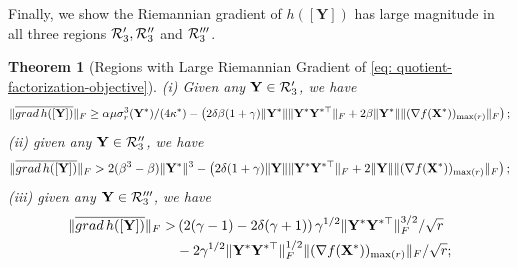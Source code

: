\documentclass[11pt]{article}
\newtheorem{Theorem}{Theorem}
\newcommand{\0}{{\mathbf{0}}}
\newcommand{\1}{{\mathbf{1}}}
\newcommand{\X}{{\mathbf{X}}}
\newcommand{\Y}{{\mathbf{Y}}}
\newcommand{\cR}{{\cal R}}
\newcommand{\grad}{{\rm grad}}
\newcommand{\F}{{\rm F}}
\begin{document}
Finally, we show the Riemannian gradient of $h([\Y])$ has large magnitude in all three regions $\cR'_3, \cR_3''$ and $ \cR_3'''$.

\begin{Theorem}[Regions with Large Riemannian Gradient of \eqref{eq: quotient-factorization-objective}] \label{th: h-large-gradient-norm}
	(i) Given any $\Y \in \cR_3'$, we have
	\begin{equation*}
		\|\overline{\grad\, h([\Y])} \|_\F \geq \alpha \mu \sigma^3_r(\Y^*)/(4\kappa^*) - \left( 2 \delta \beta ( 1 + \gamma) \|\Y^*\| \| \Y^* \Y^{*\top} \|_\F + 2 \beta \|\Y^*\| \| ( \nabla f(\X^*) )_{\max(r)} \|_\F \right);
	\end{equation*}
(ii) given any $\Y \in \cR_3''$, we have
	\begin{equation*}
		\|\overline{\grad\, h([\Y])} \|_\F > 2(\beta^3 - \beta) \|\Y^*\|^3 - \left( 2 \delta ( 1 + \gamma) \|\Y\| \| \Y^* \Y^{*\top} \|_\F + 2 \|\Y\| \| ( \nabla f(\X^*) )_{\max(r)} \|_\F \right);
	\end{equation*}
(iii) given any $\Y \in \cR_3'''$, we have
	\begin{equation*}
	\begin{split}
		\|\overline{\grad\, h([\Y])} \|_\F > &  \left( 2( \gamma- 1) - 2\delta(\gamma + 1) \right) \gamma^{1/2} \|\Y^*\Y^{*\top}\|^{3/2}_\F/\sqrt{r}  \\
		& - 2 \gamma^{1/2}\|\Y^*\Y^{*\top}\|^{1/2}_\F\| ( \nabla f(\X^*) )_{\max(r)} \|_\F/\sqrt{r} ;
	\end{split}
	\end{equation*}



\end{Theorem}
\end{document}
